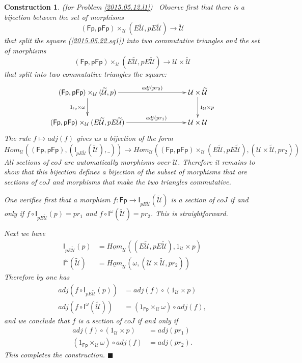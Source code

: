 \documentclass[12pt]{article}
\numberwithin{equation}{section}
\newtheorem{construction0}[proposition]{Construction}
\newenvironment{construction}[1]{\begin{construction0}(for Problem \ref{#1})\ }{$\blacksquare$ \end{construction0}}
\newcommand{\llabel}[1]{\label{#1}}
\newcommand{\sr}{\rightarrow}
\newcommand{\uu}{\underline}
\newcommand{\iHom}{\uu{Hom}}
\newcommand{\wt}{\widetilde}
\newcommand{\id}{1}            %
\newcommand{\U}{\mathcal{U}}
\newcommand{\I}{\mathsf{I}}
\newcommand{\Fp}{\mathsf{Fp}}
\newcommand{\pFp}{\mathsf{pFp}}
\begin{document}
%
\begin{construction}{2015.05.12.l1}\rm
\llabel{2015.05.22.constr1} Observe first that there is a bijection between the
set of morphisms
%
$$(\Fp,\pFp)\times_\U(E\wt{\U},pE\wt{\U})\sr \wt{\U}$$
%
that split the square (\ref{2015.05.22.sq1}) into two commutative triangles and
the set of morphisms
%
$$(\Fp,\pFp)\times_\U(E\wt{\U},pE\wt{\U})\sr \U\times\wt{\U}$$
%
that split into two commutative triangles the square:
%
$$
\begin{xy}
          \xymatrix@C=7pc{ (\Fp,\pFp)\times_\U(\wt{\U},p) \ar[r]^-{adj(pr_2)}
            \ar[d]_{\id_{\Fp}\times \omega} & \U\times \wt{\U} \ar[d]^{\id_\U\times
              p}\\ (\Fp,\pFp)\times_\U(E\wt{\U},pE\wt{\U}) \ar[r]^-{adj(pr_1)} &
            \U\times \U }
\end{xy}
$$
%
The rule $f\mapsto adj(f)$ gives us a bijection of the form
%
$$Hom_\U((\Fp,\pFp),(\I_{pE\wt{\U}}(\wt{\U}),\_))\sr Hom_\U((\Fp,\pFp)\times_\U
(E\wt{\U},pE\wt{\U}), (\U\times\wt{\U}, pr_2))$$
%
All sections of $coJ$ are automatically morphisms over $\U$. Therefore it
remains to show that this bijection defines a bijection of the subset of
morphisms that are sections of $coJ$ and morphisms that make the two triangles
commutative.

One verifies first that a morphism $f:\Fp\sr \I_{pE\wt{\U}}(\wt{\U})$ is a section
of $coJ$ if and only if $f\circ \I_{pE\wt{\U}}(p)=pr_1$ and $f\circ
\I^{\omega}(\wt{\U})=pr_2$. This is straightforward.

Next we have
%
\begin{align*}
  \I_{pE\wt{\U}}(p)&=\iHom_\U((E\wt{\U},pE\wt{\U}),\id_\U\times p) \\
  \I^{\omega}(\wt{\U})&=\iHom_\U(\omega,(\U\times\wt{\U},pr_2))
\end{align*}
%
Therefore by \cite[Lemma 8.7]{fromunivwithPi} one has
%
\begin{align*}
  adj(f\circ \I_{pE\wt{\U}}(p))&=adj(f)\circ (\id_\U\times p) \\
  adj(f\circ \I^{\omega}(\wt{\U}))&=(\id_{\Fp}\times_{\U}\omega)\circ adj(f),
\end{align*}
%
and we conclude that $f$ is a section of $coJ$ if and only if
%
\begin{align*}
  adj(f)\circ (\id_\U\times p)&=adj(pr_1) \\
  (\id_{\Fp}\times_{\U}\omega)\circ adj(f)&=adj(pr_2).
\end{align*}
% 
This completes the construction.
\end{construction}
\end{document}
